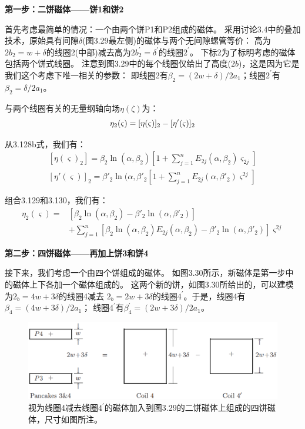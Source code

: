 \textbf{第一步：二饼磁体——饼1和饼2}

首先考虑最简单的情况：一个由两个饼P1和P2组成的磁体。
采用讨论3.4中的叠加技术，原始具有间隙$\delta$(图3.29最左侧)的磁体与两个无间隙螺管等价：
高为$2b_2 = w +\delta$的线圈2(中部)减去高为$2b_2^\prime = \delta^\prime$的线圈$2^\prime$。
下标2为了标明考虑的磁体包括两个饼式线圈。
注意到图3.29中的每个线圈仅给出了高度($2b$)，这是因为它是我们这个考虑下唯一相关的参数：
即线圈2有$\beta_2=(2w+\delta)/2a_1$；线圈$2^\prime$有$\beta_2=\delta/2a_1$。

与两个线圈有关的无量纲轴向场$\eta(\zeta)$为：
\begin{equation}
\eta_{2}(\varsigma)=[\eta(\varsigma)]_{2}-[\eta'(\varsigma)]_{2}\\%
\end{equation}

从3.128b式，我们有：
\begin{eqnarray}
{[\eta(\varsigma)_{2}]}=\beta_{2}\ln(\alpha,\beta_{2})\left[1+\sum_{j=1}^{n}E_{2j}(\alpha,\beta_{2})\varsigma_{2j}\right]\\
{[\eta'(\varsigma)]}_{2}=\beta'_{2}\ln(\alpha,\beta'_{2}\left[1+\sum_{j=1}^{n}E_{2j}(\alpha,\beta'_{2})\varsigma^{2j}\right]%
\end{eqnarray}

组合3.129和3.130，我们有：
\begin{equation}
\begin{split}
\eta_{2}(\varsigma)=&[\beta_{2}\ln(\alpha,\beta_{2})-\beta'_{2}\ln(\alpha,\beta'_{2})]\\
&+\sum_{j=1}^{n}[\beta_{2}\ln(\alpha,\beta_{2})E_{2j}(\alpha,\beta_{2})-\beta'_{2}\ln(\alpha,\beta'_{2})]\varsigma^{2j}%
\end{split}
\end{equation}

\textbf{第二步：四饼磁体——再加上饼3和饼4}

接下来，我们考虑一个由四个饼组成的磁体。
如图3.30所示，新磁体是第一步中的磁体上下各加一个磁体组成的。
这两个新的饼，如图3.30所给出的，可以建模为$2_b=4w+3\delta$的线圈4减去
$2_b=2w+3\delta$的线圈$4^\prime$。于是，线圈4有$\beta_4=(4w+3\delta)/2a_1$；
线圈$4^\prime$有$\beta_4^\prime=(2w+3\delta)/2a_1$。
\begin{figure}[htbp]
	\centering
	\includegraphics[scale=0.4]{chpt3/figs/fig3.30.eps}
	\caption{视为线圈4减去线圈$4^\prime$的磁体加入到图3.29的二饼磁体上组成的四饼磁体，尺寸如图所注。}
\end{figure}

